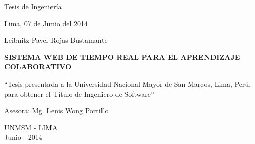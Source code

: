 \begin{titlepage}
\begin{center}
    \begin{large}
        Tesis de Ingeniería\\
    \end{large}
    \vspace*{3cm}
    \begin{flushright}
    Lima, 07 de Junio del 2014
    \end{flushright}
\end{center}
\newpage
\begin{center}
    \begin{center}
        Leibnitz Pavel Rojas Bustamante
    \end{center}
    \vspace*{3cm}
    \begin{Large}
    \textbf{SISTEMA WEB DE TIEMPO REAL PARA EL APRENDIZAJE COLABORATIVO} \\
    \end{Large}
    \vspace*{5cm}
    \begin{flushright}
    ``Tesis presentada a la Universidad Nacional Mayor de San Marcos, Lima, Perú, para obtener el Título de Ingeniero de Software''
    \end{flushright}
    \vspace*{3cm}
    \begin{flushright}
    Asesora: Mg. Lenis Wong Portillo
    \end{flushright}
    \vspace*{3cm}
    \begin{center}
        UNMSM - LIMA\\
        Junio - 2014
    \end{center}
\end{center}
\end{titlepage}
